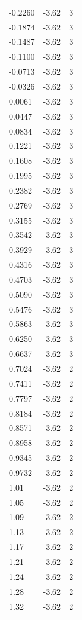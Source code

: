 \begin{longtable}{lrr}
  -0.2260 & -3.62 & 3 \\
  -0.1874 & -3.62 & 3 \\
  -0.1487 & -3.62 & 3 \\
  -0.1100 & -3.62 & 3 \\
  -0.0713 & -3.62 & 3 \\
  -0.0326 & -3.62 & 3 \\
  0.0061 & -3.62 & 3 \\
  0.0447 & -3.62 & 3 \\
  0.0834 & -3.62 & 3 \\
  0.1221 & -3.62 & 3 \\
  0.1608 & -3.62 & 3 \\
  0.1995 & -3.62 & 3 \\
  0.2382 & -3.62 & 3 \\
  0.2769 & -3.62 & 3 \\
  0.3155 & -3.62 & 3 \\
  0.3542 & -3.62 & 3 \\
  0.3929 & -3.62 & 3 \\
  0.4316 & -3.62 & 3 \\
  0.4703 & -3.62 & 3 \\
  0.5090 & -3.62 & 3 \\
  0.5476 & -3.62 & 3 \\
  0.5863 & -3.62 & 3 \\
  0.6250 & -3.62 & 3 \\
  0.6637 & -3.62 & 3 \\
  0.7024 & -3.62 & 2 \\
  0.7411 & -3.62 & 2 \\
  0.7797 & -3.62 & 2 \\
  0.8184 & -3.62 & 2 \\
  0.8571 & -3.62 & 2 \\
  0.8958 & -3.62 & 2 \\
  0.9345 & -3.62 & 2 \\
  0.9732 & -3.62 & 2 \\
  1.01 & -3.62 & 2 \\
  1.05 & -3.62 & 2 \\
  1.09 & -3.62 & 2 \\
  1.13 & -3.62 & 2 \\
  1.17 & -3.62 & 2 \\
  1.21 & -3.62 & 2 \\
  1.24 & -3.62 & 2 \\
  1.28 & -3.62 & 2 \\
  1.32 & -3.62 & 2 \\

\end{longtable}
